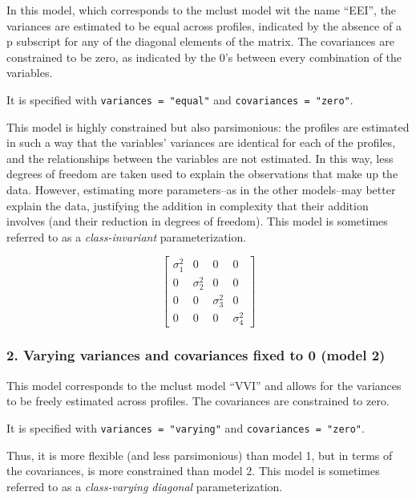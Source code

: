 \documentclass[man]{apa6}
\begin{document}
In this model, which corresponds to the mclust model wit the name \enquote{EEI}, the variances are estimated to be equal across profiles, indicated by the absence of a p subscript for any of the diagonal elements of the matrix. The covariances are constrained to be zero, as indicated by the 0's between every combination of the variables.

It is specified with \texttt{variances\ =\ "equal"} and \texttt{covariances\ =\ "zero"}.

This model is highly constrained but also parsimonious: the profiles are estimated in such a way that the variables' variances are identical for each of the profiles, and the relationships between the variables are not estimated. In this way, less degrees of freedom are taken used to explain the observations that make up the data. However, estimating more parameters--as in the other models--may better explain the data, justifying the addition in complexity that their addition involves (and their reduction in degrees of freedom). This model is sometimes referred to as a \emph{class-invariant} parameterization.

\[
\left[ \begin{matrix} { \sigma  }_{ 1 }^{ 2 } & 0 & 0 & 0 \\ 0 & { \sigma  }_{ 2 }^{ 2 } & 0 & 0 \\ 0 & 0 & { \sigma  }_{ 3 }^{ 2 } & 0 \\ 0 & 0 & 0 & { \sigma  }_{ 4 }^{ 2 } \end{matrix} \right] 
\]

\hypertarget{varying-variances-and-covariances-fixed-to-0-model-2}{%
\subsubsection{2. Varying variances and covariances fixed to 0 (model 2)}\label{varying-variances-and-covariances-fixed-to-0-model-2}}

This model corresponds to the mclust model \enquote{VVI} and allows for the variances to be freely estimated across profiles. The covariances are constrained to zero.

It is specified with \texttt{variances\ =\ "varying"} and \texttt{covariances\ =\ "zero"}.

Thus, it is more flexible (and less parsimonious) than model 1, but in terms of the covariances, is more constrained than model 2. This model is sometimes referred to as a \emph{class-varying diagonal} parameterization.
\end{document}
